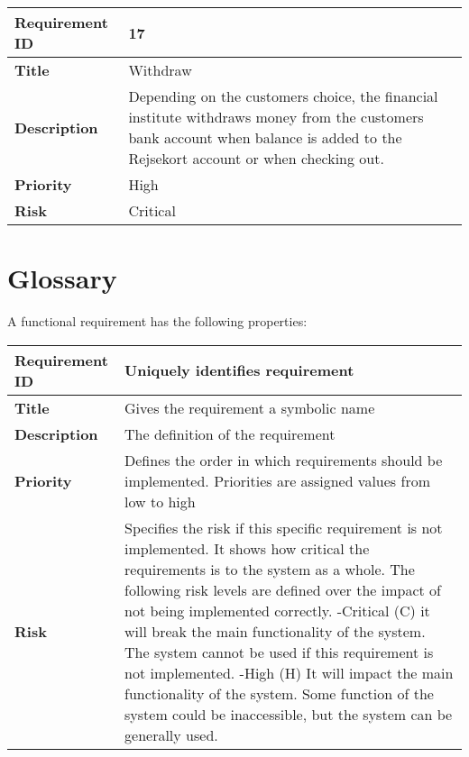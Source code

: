 \begin{center}
	\def\arraystretch{1.5}%
    \begin{tabular}{ | p{5cm} | p{5cm} |}
    \hline
    	\textbf{Requirement ID} & 17 \\ \hline
		\textbf{Title} & Withdraw\\ \hline
		\textbf{Description} & Depending on the customers choice, the financial institute withdraws money from the customers bank account when balance is added to the Rejsekort account or when checking out.\\ \hline
		\textbf{Priority} & High\\ \hline
		\textbf{Risk} & Critical\\
      \hline
    \end{tabular}
\end{center}

\section*{Glossary}

A functional requirement has the following properties:

\begin{center}
	\def\arraystretch{1.5}%
    \begin{tabular}{ | p{5cm} | p{5cm} |}
    \hline
    	\textbf{Requirement ID} & Uniquely identifies requirement \\ \hline
		\textbf{Title} & Gives the requirement a symbolic name\\ \hline
		\textbf{Description} & The definition of the requirement\\ \hline
		\textbf{Priority} & Defines the order in which requirements should be implemented. Priorities are assigned values from low to high\\ \hline
		\textbf{Risk} & Specifies the risk if this specific requirement is not implemented. It shows how critical the requirements is to the system as a whole. The following risk levels are defined over the impact of not being implemented correctly.
 -Critical (C) it will break the main functionality of the system. The system cannot be used if this requirement is not implemented.
 -High (H) It will impact the main functionality of the system. Some function of the system could be inaccessible, but the system can be generally used.\\
      \hline
    \end{tabular}
\end{center}
